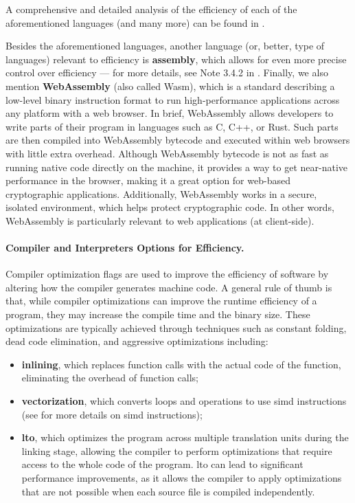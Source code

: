 A comprehensive and detailed analysis of the efficiency of each of the aforementioned languages (and many more) can be found in \cite{pereira_ranking_2021}.

Besides the aforementioned languages, another language (or, better, type of languages) relevant to efficiency is \textbf{assembly}, which allows for even more precise control over efficiency --- for more details, see Note 3.4.2 in . Finally, we also mention \textbf{WebAssembly} (also called Wasm), which is a standard describing a low-level binary instruction format to run high-performance applications across any platform with a web browser. In brief, WebAssembly allows developers to write parts of their program in languages such as C, C++, or Rust. Such parts are then compiled into WebAssembly bytecode and executed within web browsers with little extra overhead. Although WebAssembly bytecode is not as fast as running native code directly on the machine, it provides a way to get near-native performance in the browser, making it a great option for web-based cryptographic applications. Additionally, WebAssembly works in a secure, isolated environment, which helps protect cryptographic code. In other words, WebAssembly is particularly relevant to web applications (at client-side).


\paragraph*{Compiler and Interpreters Options for Efficiency.}

Compiler optimization flags are used to improve the efficiency of software by altering how the compiler generates machine code. A general rule of thumb is that, while compiler optimizations can improve the runtime efficiency of a program, they may increase the compile time and the binary size. These optimizations are typically achieved through techniques such as constant folding, dead code elimination, and aggressive optimizations including:

\begin{itemize}
	
	\item \textbf{inlining}, which replaces function calls with the actual code of the function, eliminating the overhead of function calls;
	
	\item \textbf{vectorization}, which converts loops and operations to use \gls{simd} instructions (see  for more details on \gls{simd} instructions);
	
	\item \textbf{\gls{lto}}, which optimizes the program across multiple translation units during the linking stage, allowing the compiler to perform optimizations that require access to the whole code of the program. \gls{lto} can lead to significant performance improvements, as it allows the compiler to apply optimizations that are not possible when each source file is compiled independently.
	
\end{itemize}


